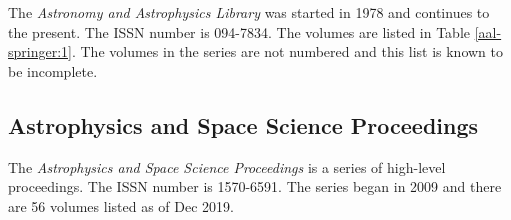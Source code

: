 The {\itshape Astronomy and Astrophysics Library} was started in 1978 and
continues to the present. The ISSN number is 094-7834. The volumes are
listed in Table \ref{aal-springer:1}.  The volumes in the series are
not numbered and this list is known to be incomplete.

\subsection{Astrophysics and Space Science Proceedings}

The {\itshape Astrophysics and Space Science Proceedings} is a series
of high-level proceedings.  The ISSN number is 1570-6591.  The series
began in 2009 and there are 56 volumes listed as of Dec 2019.

